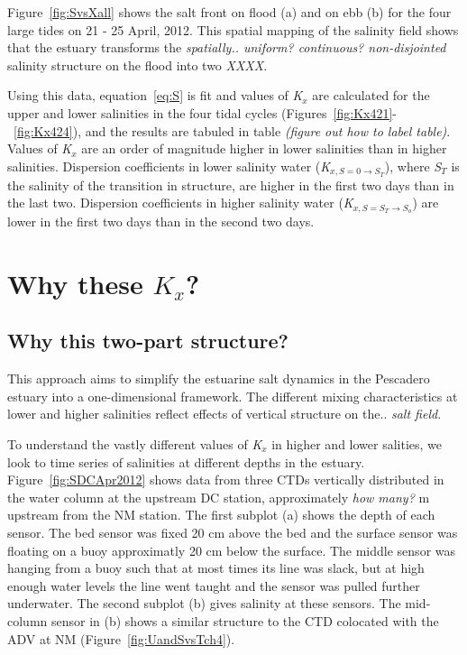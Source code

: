 Figure~\ref{fig:SvsXall} shows the salt front on flood (a) and on ebb (b) for the four large tides on 21 - 25 April, 2012. This spatial mapping of the salinity field shows that the estuary transforms the \emph{spatially.. uniform? continuous? non-disjointed} salinity structure on the flood into two \emph{XXXX}. 

Using this data, equation~\ref{eq:S} is fit and values of \emph{K$_x$} are calculated for the upper and lower salinities in the four tidal cycles (Figures~\ref{fig:Kx421}-~\ref{fig:Kx424}), and the results are tabuled in table \emph{(figure out how to label table)}. Values of \emph{K$_x$} are an order of magnitude higher in lower salinities than in higher salinities. Dispersion coefficients in lower salinity water (\emph{K$_{x,S=0 \rightarrow S_T}$}), where \emph{S$_T$} is the salinity of the transition in structure, are higher in the first two days than in the last two. Dispersion coefficients in higher salinity water (\emph{K$_{x,S=S_T \rightarrow S_o}$}) are lower in the first two days than in the second two days. 


\section{Why these $K_x$?}

\subsection{Why this two-part structure?}

This approach aims to simplify the estuarine salt dynamics in the Pescadero estuary into a one-dimensional framework. The different mixing characteristics at lower and higher salinities reflect effects of vertical structure on the.. \emph{salt field}. 

To understand the vastly different values of \emph{K$_x$} in higher and lower salities, we look to time series of salinities at different depths in the estuary. Figure~\ref{fig:SDCApr2012} shows data from three CTDs vertically distributed in the water column at the upstream DC station, approximately \emph{how many?} m upstream from the NM station. The first subplot (a) shows the depth of each sensor. The bed sensor was fixed 20 cm above the bed and the surface sensor was floating on a buoy approximatly 20 cm below the surface. The middle sensor was hanging from a buoy such that at most times its line was slack, but at high enough water levels the line went taught and the sensor was pulled further underwater. The second subplot (b) gives salinity at these sensors. The mid-column sensor in (b) shows a similar structure to the CTD colocated with the ADV at NM (Figure~\ref{fig:UandSvsTch4}).

